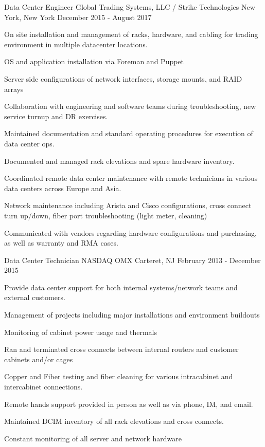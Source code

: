\begin{cventries}
	\cventry
	{Data Center Engineer}
	{Global Trading Systems, LLC / Strike Technologies}
	{New York, New York}
	{December 2015 - August 2017}
	{
		\begin{cvitems}
		\item {On site installation and management of racks, hardware, and cabling for trading environment in multiple datacenter locations.}
		\item {OS and application installation via Foreman and Puppet}
		\item {Server side configurations of network interfaces, storage mounts, and RAID arrays}
		\item {Collaboration with engineering and software teams during troubleshooting, new service turnup and DR exercises.}
		\item {Maintained documentation and standard operating procedures for execution of data center ops.}
		\item {Documented and managed rack elevations and spare hardware inventory.}
		\item {Coordinated remote data center maintenance with remote technicians in various data centers across Europe and Asia.}
		\item {Network maintenance including Arista and Cisco configurations, cross connect turn up/down, fiber port troubleshooting (light meter, cleaning)}
  		\item {Communicated with vendors regarding hardware configurations and purchasing, as well as warranty and RMA cases.}
		\end{cvitems}
	}


	\cventry
	{Data Center Technician}
	{NASDAQ OMX}
	{Carteret, NJ}
	{February 2013 - December 2015}
	{
		\begin{cvitems}
		\item {Provide data center support for both internal systems/network teams and external customers.}
		\item {Management of projects including major installations and environment buildouts}
  		\item {Monitoring of cabinet power usage and thermals}
		\item {Ran and terminated cross connects between internal routers and customer cabinets and/or cages}
		\item {Copper and Fiber testing and fiber cleaning for various intracabinet and intercabinet connections.}
		\item {Remote hands support provided in person as well as via phone, IM, and email.}
		\item {Maintained DCIM inventory of all rack elevations and cross connects.}
		\item {Constant monitoring of all server and network hardware}
		\end{cvitems}
	}

\end{cventries}
